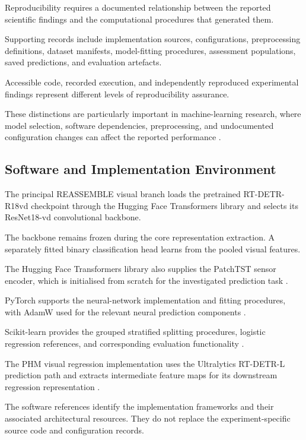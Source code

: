 Reproducibility requires a documented relationship between the reported scientific findings and the computational procedures that generated them.

Supporting records include implementation sources, configurations, preprocessing definitions, dataset manifests, model-fitting procedures, assessment populations, saved predictions, and evaluation artefacts.

Accessible code, recorded execution, and independently reproduced experimental findings represent different levels of reproducibility assurance.

These distinctions are particularly important in machine-learning research, where model selection, software dependencies, preprocessing, and undocumented configuration changes can affect the reported performance \parencite{P009}.

\subsection{Software and Implementation Environment}

The principal REASSEMBLE visual branch loads the pretrained RT-DETR-R18vd checkpoint through the Hugging Face Transformers library and selects its ResNet18-vd convolutional backbone.

The backbone remains frozen during the core representation extraction. A separately fitted binary classification head learns from the pooled visual features.

The Hugging Face Transformers library also supplies the PatchTST sensor encoder, which is initialised from scratch for the investigated prediction task \parencite{Wolf2020Transformers}.

PyTorch supports the neural-network implementation and fitting procedures, with AdamW used for the relevant neural prediction components \parencite{Paszke2019PyTorch}.

Scikit-learn provides the grouped stratified splitting procedures, logistic regression references, and corresponding evaluation functionality \parencite{Pedregosa2011ScikitLearn}.

The PHM visual regression implementation uses the Ultralytics RT-DETR-L prediction path and extracts intermediate feature maps for its downstream regression representation \parencite{UltralyticsRTDETR}.

The software references identify the implementation frameworks and their associated architectural resources. They do not replace the experiment-specific source code and configuration records.

